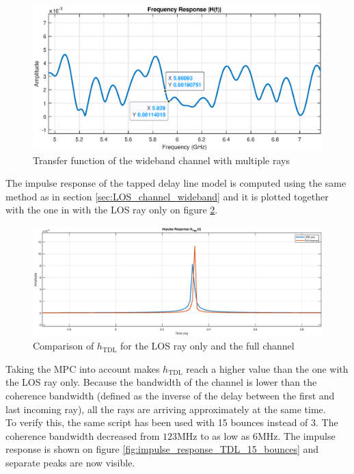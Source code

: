 \documentclass[10pt,a4paper]{ULBreport}
\begin{document}
\begin{figure}[H]
    \centering
    \includegraphics[width=1\textwidth]{5_2.eps}
    \caption{Transfer function of the wideband channel with multiple rays}
    \label{fig:transfer_function_full}
\end{figure}

The impulse response of the tapped delay line model is computed using the same method as in section \ref{sec:LOS_channel_wideband} and it is plotted together with the one in with the LOS ray only on figure \ref{fig:impulse_response_TDL}. 

\begin{figure}[H]
    \centering
    \includegraphics[width=1\textwidth]{comparison_h_TDL.eps}
    \caption{Comparison of $h_{\text{TDL}}$ for the LOS ray only and the full channel}
    \label{fig:impulse_response_TDL}
\end{figure}

Taking the MPC into account makes $h_{\text{TDL}}$ reach a higher value than the one with the LOS ray only. Because the bandwidth of the channel is lower than the coherence bandwidth (defined as the inverse of the delay between the first and last incoming ray), all the rays are arriving approximately at the same time. \\
To verify this, the same script has been used with 15 bounces instead of 3. The coherence bandwidth decreased from $123$MHz to as low as $6$MHz. The impulse response is shown on figure \ref{fig:impulse_response_TDL_15_bounces} and separate peaks are now visible.
\end{document}
